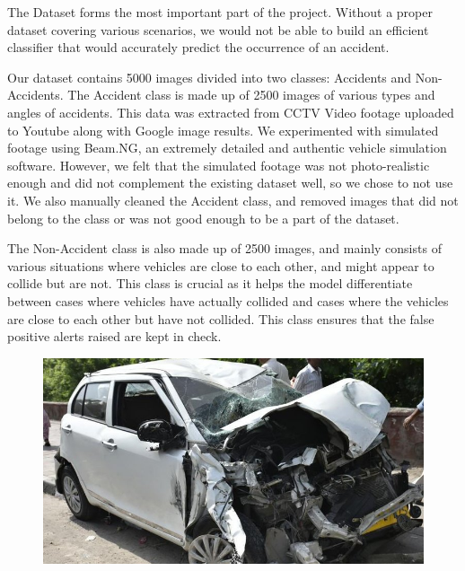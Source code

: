\documentclass[ 12pt,a4paper,twocolumn,fleqn]{article}
\begin{document}
\begin{adjustwidth}{3.5em}{0pt}
The Dataset forms the most important part of the project. Without a proper dataset covering various scenarios, we would not be able to build an efficient classifier that would accurately predict the occurrence of an accident.

Our dataset contains 5000 images divided into two classes: Accidents and Non-Accidents. The Accident class is made up of 2500 images of various types and angles of accidents. This data was extracted from CCTV Video footage uploaded to Youtube along with Google image results.
We experimented with simulated footage using Beam.NG, an extremely detailed and authentic vehicle simulation software. However, we felt that the simulated footage was not photo-realistic enough and did not complement the existing dataset well, so we chose to not use it. We also manually cleaned the Accident class, and removed images that did not belong to the class or was not good enough to be a part of the dataset.

The Non-Accident class is also made up of 2500 images, and mainly consists of various situations where vehicles are close to each other, and might appear to collide but are not. This class is crucial as it helps the model differentiate between cases where vehicles have actually collided and cases where the vehicles are close to each other but have not collided. This class ensures that the false positive alerts raised are kept in check.
    
\newpage

\vspace*{\fill}
\begin{figure}[H]
\begin{center}
    \hspace*{0.4in}
    \includegraphics[scale=0.3]{media/acc1.jpg}
    
    \hspace{0.1cm}
\end{center}
\end{figure}
\begin{figure}[H]
\begin{center}
    

\end{center}
\end{figure}
\end{adjustwidth}
\end{document}
